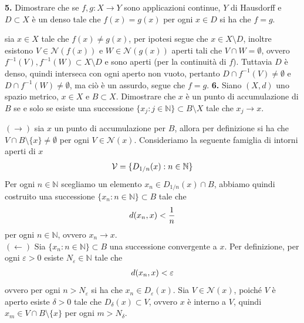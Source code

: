 \documentclass[oneside, 11pt]{amsbook}
\makeatletter
\newcommand{\0}{{(0)}}
\newcommand{\3}{{(3)}}
\theoremstyle{colonplain}
\theoremstyle{colondefinition}
\theoremstyle{colonremark}
\numberwithin{equation}{chapter}
\renewcommand{\proofname}{Dimostrazione}
\renewenvironment{proof}[1][\proofname]{\par
  \pushQED{\qed}%
  \normalfont \topsep6\p@\@plus6\p@\relax
  \trivlist
  \item[\hskip\labelsep\bfseries #1:]\ignorespaces
}{%
  \popQED\endtrivlist\@endpefalse
}
\makeatother
\begin{document}
\textbf{5.} Dimostrare che se $f, g : X \longrightarrow Y$ sono applicazioni continue, $Y$ di Hausdorff e $D \subset X$ è un denso tale che $f(x) = g(x)$ per ogni $x \in D$ si ha che $f = g$.
\begin{proof}
sia $x \in X$ tale che $f(x) \neq g(x)$, per ipotesi segue che $x \in X \setminus D$, inoltre esistono $V \in \mathcal{N}(f(x))$ e $W \in \mathcal{N}(g(x))$ aperti tali che $V \cap W = \emptyset$, ovvero $f^{-1}(V), f^{-1}(W) \subset X \setminus D$ e sono aperti (per la continuità di $f$). Tuttavia $D$ è denso, quindi interseca con ogni aperto non vuoto, pertanto $D \cap f^{-1}(V) \neq \emptyset$ e $D \cap f^{-1}(W) \neq \emptyset$, ma ciò è un assurdo, segue che $f = g$.
\end{proof}
\textbf{6.} Siano $(X, d)$ uno spazio metrico, $x \in X$ e $B \subset X$. Dimostrare che $x$ è un punto di accumulazione di $B$ se e solo se esiste una successione $\{x_j : j \in \mathbb{N}\} \subset B\setminus X$ tale che $x_j \rightarrow x$.
\begin{proof}
$(\rightarrow)$ sia $x$ un punto di accumulazione per $B$, allora per definizione si ha che $V \cap B \setminus \{x\} \neq \emptyset$ per ogni $V \in \mathcal{N}(x)$. Consideriamo la seguente famiglia di intorni aperti di $x$
\begin{align}
    \mathcal{V} = \{D_{1/n}(x) : n \in \mathbb{N}\} \notag
\end{align}
Per ogni $n \in \mathbb{N}$ scegliamo un elemento $x_n \in D_{1/n}(x) \cap B$, abbiamo quindi costruito una successione $\{x_n : n \in \mathbb{N}\} \subset B$ tale che
\begin{align}
    d(x_n, x) < \frac{1}{n} \notag
\end{align}
per ogni $n \in \mathbb{N}$, ovvero $x_n \rightarrow x$. \\
$(\leftarrow)$ Sia $\{x_n : n \in \mathbb{N}\} \subset B$ una successione convergente a $x$. Per definizione, per ogni $\varepsilon > 0$ esiste $N_\varepsilon \in \mathbb{N}$ tale che
\begin{align}
    d(x_n, x) < \varepsilon \notag
\end{align}
ovvero per ogni $n > N_\varepsilon$ si ha che $x_n \in D_{\varepsilon}(x)$. Sia $V \in \mathcal{N}(x)$, poiché $V$ è aperto esiste $\delta > 0$ tale che $D_\delta(x) \subset V$, ovvero $x$ è interno a $V$, quindi $x_m \in V \cap B \setminus \{x\}$ per ogni $m > N_\delta$.
\end{proof}
\end{document}
